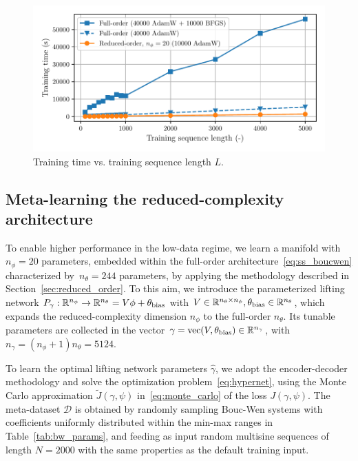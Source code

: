 \documentclass{article}
\newcommand{\R}{\mathbb{R}}
\newcommand{\fullpar}{\theta}
\newcommand{\redpar}{\phi}
\newcommand{\projpar}{\gamma}
\newcommand{\encpar}{\psi}
\newcommand{\DD}{\mathcal{D}}
\begin{document}
\begin{figure}
\centering
    \includegraphics[width=.8\hsize]{img/training_times_paper.pdf}
    \caption{Training time vs. training sequence length $L$.}
    \label{fig:training_time}
\end{figure}


\subsection{Meta-learning the reduced-complexity architecture}
\label{sec:meta_training}
To enable higher performance in the low-data regime, we learn a manifold with $n_\phi=20$ parameters, embedded within the full-order architecture~\eqref{eq:ss_boucwen} characterized by~$n_\theta=244$ parameters, by applying the methodology described in Section~\ref{sec:reduced_order}.
To this aim, we introduce the parameterized lifting network $P_\projpar : \R^{n_\phi} \rightarrow \R^{n_\theta} = V \phi + \theta_{\rm bias}$ with $V \in \R^{n_\theta \times n_\phi}, \theta_{\rm bias} \in \R^{n_\theta}$,  which expands the reduced-complexity dimension $n_\phi$ to the full-order $n_\theta$. Its tunable parameters are collected in the vector $\projpar = \mathrm{vec}(V, \theta_{\rm bias}) \in \R^{n_\projpar}$, with $n_\projpar = (n_\redpar + 1) n_\fullpar = 5124$. 

 To learn the optimal lifting network parameters $\hat \projpar$, we adopt the encoder-decoder methodology and solve the optimization 
problem~\eqref{eq:hypernet}, using the Monte Carlo approximation $\tilde J(\gamma, \psi)$ in~\eqref{eq:monte_carlo} 
of the loss $J(\projpar, \encpar)$.
The meta-dataset $\DD$ is obtained by randomly sampling Bouc-Wen systems with coefficients uniformly distributed within the min-max ranges in Table~\ref{tab:bw_params}, and feeding as input random multisine sequences of length $N=2000$ with the same properties as the default training input.
\end{document}
